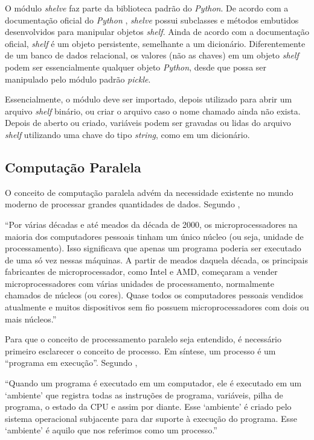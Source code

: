 \documentclass[12pt]{article}
\newcommand{\aspas}[1]{``#1''} %
\newcommand{\citacao}[1]{
	\singlespacing %
	\begin{flushright}
		\begin{minipage}{0.75\linewidth} %
			{\fontsize{10}{\baselineskip}\selectfont \aspas{#1}}
		\end{minipage}
	\end{flushright}
	\onehalfspacing %
}
\begin{document}
O módulo \textit{shelve} faz parte da biblioteca padrão do \textit{Python}. De acordo com a documentação oficial do \textit{Python} \cite{python:2022}, \textit{shelve} possui subclasses e métodos embutidos desenvolvidos para manipular objetos \textit{shelf}. Ainda de acordo com a documentação oficial, \textit{shelf} é um objeto persistente, semelhante a um dicionário. Diferentemente de um banco de dados relacional, os valores (não as chaves) em um objeto \textit{shelf} podem ser essencialmente qualquer objeto \textit{Python}, desde que possa ser manipulado pelo módulo padrão \textit{pickle}.

Essencialmente, o módulo deve ser importado, depois utilizado para abrir um arquivo \textit{shelf} binário, ou criar o arquivo caso o nome chamado ainda não exista. Depois de aberto ou criado, variáveis podem ser gravadas ou lidas do arquivo \textit{shelf} utilizando uma chave do tipo \textit{string}, como em um dicionário.

\subsection{Computação Paralela}
\label{computacao_paralela}

O conceito de computação paralela advém da necessidade existente no mundo moderno de processar grandes quantidades de dados. Segundo \cite{perkovic:2016}, 

\citacao{Por várias décadas e até meados da década de 2000, os microprocessadores na maioria dos computadores pessoais tinham
	um único núcleo (ou seja, unidade de processamento). Isso significava que apenas um programa poderia ser executado de
	uma só vez nessas máquinas. A partir de meados daquela década, os principais fabricantes de microprocessador, como Intel
	e AMD, começaram a vender microprocessadores com várias unidades de processamento, normalmente chamados
	de núcleos (ou cores). Quase todos os computadores pessoais vendidos atualmente e muitos dispositivos sem fio possuem
	microprocessadores com dois ou mais núcleos.}

Para que o conceito de processamento paralelo seja entendido, é necessário primeiro esclarecer o conceito de processo. Em síntese, um processo é um \aspas{programa em execução}. Segundo \cite{perkovic:2016},

\citacao{Quando um programa é executado em um computador, ele é executado em um `ambiente' que registra todas as instruções de programa, variáveis, pilha de programa, o estado da CPU e assim por diante. Esse `ambiente' é criado pelo sistema operacional subjacente para dar suporte à execução do programa. Esse `ambiente' é aquilo que nos referimos como um processo.}
\end{document}
